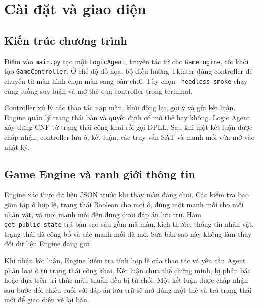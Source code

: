\section{Cài đặt và giao diện}
\subsection{Kiến trúc chương trình}
Điểm vào \texttt{main.py} tạo một \texttt{LogicAgent}, truyền tác tử
cho \texttt{GameEngine}, rồi khởi tạo \texttt{GameController}. Ở chế độ
đồ họa, bộ điều hướng Tkinter dùng controller để chuyển từ màn hình
chọn màn sang bàn chơi. Tùy chọn \texttt{--headless-smoke} chạy cùng
luồng suy luận và mở thẻ qua controller trong terminal.

Controller xử lý các thao tác nạp màn, khởi động lại, gợi ý và gửi kết
luận. Engine quản lý trạng thái bàn và quyết định có mở thẻ hay không.
Logic Agent xây dựng CNF từ trạng thái công khai rồi gọi DPLL. Sau khi
một kết luận được chấp nhận, controller lưu ô, kết luận, các truy vấn
SAT và manh mối vừa mở vào nhật ký.

\subsection{Game Engine và ranh giới thông tin}
Engine xác thực dữ liệu JSON trước khi thay màn đang chơi. Các kiểm tra
bao gồm tập ô hợp lệ, trạng thái Boolean cho mọi ô, đúng một manh mối
cho mỗi nhân vật, và mọi manh mối đều đúng dưới đáp án lưu trữ. Hàm
\texttt{get\_public\_state} trả bản sao sâu gồm mã màn, kích thước,
thông tin nhân vật, trạng thái đã công bố và các manh mối đã mở. Sửa
bản sao này không làm thay đổi dữ liệu Engine đang giữ.

Khi nhận kết luận, Engine kiểm tra tính hợp lệ của thao tác và yêu cầu
Agent phân loại ô từ trạng thái công khai. Kết luận chưa thể chứng
minh, bị phản bác hoặc dựa trên tri thức mâu thuẫn đều bị từ chối.
Một kết luận được chấp nhận sau bước đối chiếu cuối với đáp án lưu
trữ sẽ mở đúng một thẻ và trả trạng thái mới để giao diện vẽ lại bàn.


